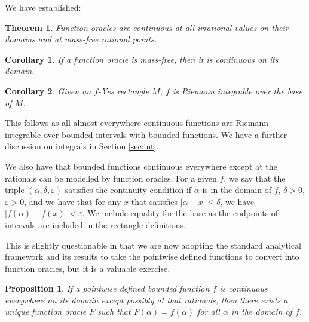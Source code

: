 \documentclass[12pt]{article}
\newtheorem{theorem}{Theorem}[section]
\newtheorem{corollary}{Corollary}[section]
\newtheorem{proposition}{Proposition}[section]
\begin{document}
We have established:

\begin{theorem}
    Function oracles are continuous at all irrational values on their domains and at mass-free rational points. 
\end{theorem}

\begin{corollary}
If a function oracle is mass-free, then it is continuous on its domain. 
\end{corollary}

\begin{corollary}
Given an $f$-Yes rectangle $M$, $f$ is Riemann integrable over the base of $M$. 
\end{corollary}

This follows as all almost-everywhere continuous functions are Riemann-integrable over bounded intervals with bounded functions. We have a further  discussion on integrals in Section \ref{sec:int}.

We also have that bounded functions continuous everywhere except at the rationals can be modelled by function oracles. For a given $f$, we say that the triple $(\alpha, \delta, \varepsilon)$ satisfies the continuity condition if $\alpha$ is in the domain of $f$, $\delta > 0$, $\varepsilon > 0$, and we have that for any $x$ that satisfies $|\alpha - x| \leq \delta$, we have $|f(\alpha) - f(x) | < \varepsilon$. We include equality for the base as the endpoints of intervals are included in the rectangle definitions.

This is slightly questionable in that we are now adopting the standard analytical framework and its results to take the pointwise defined functions to convert into function oracles, but it is a valuable exercise. 

\begin{proposition}
    If a pointwise defined bounded function $f$ is continuous everywhere on its domain except possibly at that rationals, then there exists a unique function oracle $F$ such that $F(\alpha) = f(\alpha)$ for all $\alpha$ in the domain of $f$.
\end{proposition}
\end{document}
